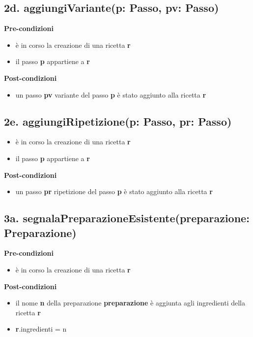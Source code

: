 \documentclass[12pt]{extarticle}
\begin{document}
\subsection*{2d. aggiungiVariante(p: Passo, pv: Passo)}

\textbf{Pre-condizioni}
\begin{itemize}
  \item è in corso la creazione di una ricetta  \textbf{r}
  \item il passo \textbf{p} appartiene a \textbf{r}
\end{itemize}
\textbf{Post-condizioni}
\begin{itemize}
  \item un passo  \textbf{pv} variante del passo  \textbf{p} è stato aggiunto alla ricetta  \textbf{r}
\end{itemize}

\subsection*{2e. aggiungiRipetizione(p: Passo, pr: Passo)}
\begin{itemize}
  \item è in corso la creazione di una ricetta  \textbf{r}
  \item il passo \textbf{p} appartiene a \textbf{r}
\end{itemize}
\textbf{Post-condizioni}
\begin{itemize}
  \item un passo  \textbf{pr} ripetizione del passo  \textbf{p} è stato aggiunto alla ricetta  \textbf{r}
\end{itemize}

\subsection*{3a. segnalaPreparazioneEsistente(preparazione: Preparazione)}

\textbf{Pre-condizioni}
\begin{itemize}
  \item è in corso la creazione di una ricetta  \textbf{r}
\end{itemize}
\textbf{Post-condizioni}
\begin{itemize}
  \item il nome \textbf{n} della preparazione  \textbf{preparazione} è aggiunta agli ingredienti della ricetta  \textbf{r}
  \item \textbf{r}.ingredienti = n
\end{itemize}
\end{document}
